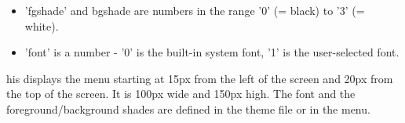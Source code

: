   \begin{itemize}
    \item 'fgshade' and bgshade are numbers in the range '0' (= black) to '3'
    (= white).
    \item 'font' is a number - '0' is the built-in system font, '1' is the
    user-selected font.
  \end{itemize}

\begin{example}
\end{example}
his displays the menu starting at 15px from the left of the screen and 20px
from the top of the screen.  It is 100px wide and 150px high.
The font and the foreground/background shades are defined in the theme
 file or in the  menu.

